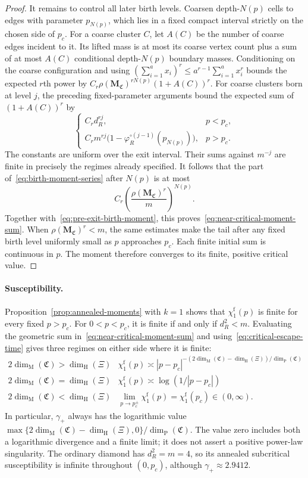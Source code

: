 \documentclass[scheme=plain,11pt]{ctexart}
\theoremstyle{definition}
\theoremstyle{remark}
\newcommand{\dimhaus}{\dim_{\mathrm H}}
\newcommand{\dimmass}{\dim_{\mathrm M}}
\begin{document}
\begin{proof}
It remains to control all later birth levels.
Coarsen depth-$N(p)$ cells to edges with parameter $p_{N(p)}$, which lies in a fixed compact interval strictly on the chosen side of $p_c$.
For a coarse cluster $C$, let $A(C)$ be the number of coarse edges incident to it.
Its lifted mass is at most its coarse vertex count plus a sum of at most $A(C)$ conditional depth-$N(p)$ boundary masses.
Conditioning on the coarse configuration and using
$(\sum_{i=1}^a x_i)^r\le a^{r-1}\sum_{i=1}^a x_i^r$ bounds the expected $r$th power by
$C_r\rho(\mathbf M_{\mathfrak C})^{rN(p)}(1+A(C))^r$.
For coarse clusters born at level $j$, the preceding fixed-parameter arguments bound the expected sum of $(1+A(C))^r$ by
\[
 \begin{cases}
 C_rd_R^{rj},&p<p_c,\\
 C_rm^{rj}\bigl(1-\varphi_R^{\circ(j-1)}(p_{N(p)})\bigr),&p>p_c.
 \end{cases}
\]
The constants are uniform over the exit interval.
Their sums against $m^{-j}$ are finite in precisely the regimes already specified.
It follows that the part of~\eqref{eq:birth-moment-series} after $N(p)$ is at most
\[
 C_r\left(\frac{\rho(\mathbf M_{\mathfrak C})^r}{m}\right)^{N(p)}.
\]
Together with~\eqref{eq:pre-exit-birth-moment}, this proves~\eqref{eq:near-critical-moment-sum}.
When $\rho(\mathbf M_{\mathfrak C})^r<m$, the same estimates make the tail after any fixed birth level uniformly small as $p$ approaches $p_c$.
Each finite initial sum is continuous in $p$.
The moment therefore converges to its finite, positive critical value.
\end{proof}


\paragraph{Susceptibility.}
Proposition~\ref{prop:annealed-moments} with $k=1$ shows that $\chi_1^{\mathrm f}(p)$ is finite for every fixed $p>p_c$.
For $0<p<p_c$, it is finite if and only if $d_R^2<m$.
Evaluating the geometric sum in~\eqref{eq:near-critical-moment-sum} and using~\eqref{eq:critical-escape-time} gives three regimes on either side where it is finite:
\[
 \begin{array}{c|c}
 2\dimmass(\mathfrak C)>\dimhaus(\Xi)
 &\chi_1^{\mathrm f}(p)\asymp
 |p-p_c|^{-(2\dimmass(\mathfrak C)-\dimhaus(\Xi))/\dim_{\mathrm P}(\mathfrak C)}\\[2pt]
 2\dimmass(\mathfrak C)=\dimhaus(\Xi)
 &\chi_1^{\mathrm f}(p)\asymp\log(1/|p-p_c|)\\[2pt]
 2\dimmass(\mathfrak C)<\dimhaus(\Xi)
 &\displaystyle\lim_{p\to p_c^\pm}\chi_1^{\mathrm f}(p)=\chi_1^{\mathrm f}(p_c)\in(0,\infty).
 \end{array}
\]
In particular, $\gamma_+$ always has the logarithmic value
$\max\{2\dimmass(\mathfrak C)-\dimhaus(\Xi),0\}/\dim_{\mathrm P}(\mathfrak C)$.
The value zero includes both a logarithmic divergence and a finite limit; it does not assert a positive power-law singularity.
The ordinary diamond has $d_R^2=m=4$, so its annealed subcritical susceptibility is infinite throughout $(0,p_c)$, although $\gamma_+\approx2.9412$.
\end{document}
